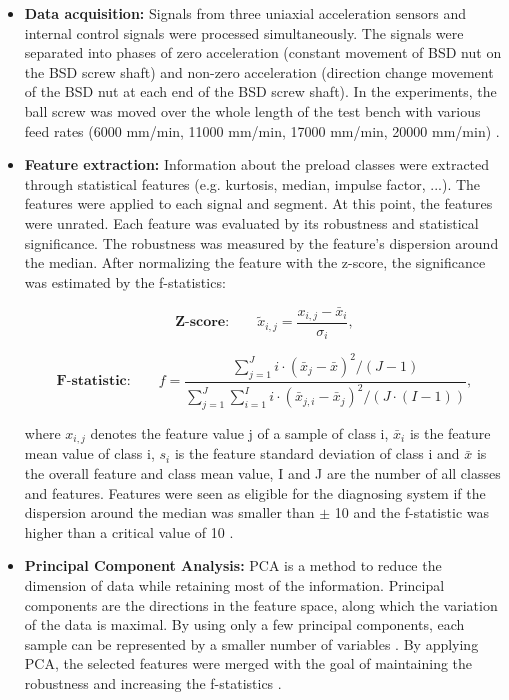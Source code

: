 \begin{itemize}
    \item \textbf{Data acquisition:} Signals from three uniaxial acceleration sensors and internal control signals were processed simultaneously. The signals were separated into phases of zero acceleration (constant movement of BSD nut on the BSD screw shaft) and non-zero acceleration (direction change movement of the BSD nut at each end of the BSD screw shaft). In the experiments, the ball screw was moved over the whole length of the test bench with various feed rates (6000 mm/min, 11000 mm/min, 17000 mm/min, 20000 mm/min) \cite{Denkena2021}.
    \item \textbf{Feature extraction:} Information about the preload classes were extracted through statistical features (e.g. kurtosis, median, impulse factor, ...). The features were applied to each signal and segment. At this point, the features were unrated. Each feature was evaluated by its robustness and statistical significance. The robustness was measured by the feature's dispersion around the median. After normalizing the feature with the z-score, the significance was estimated by the f-statistics:

    \begin{equation}
        \textbf{Z-score:}\qquad \tilde{x}_{i,j} = \frac{x_{i,j} - \bar x_{i}}{\sigma_{i}},
    \end{equation}
    
    \begin{equation}
        \textbf{F-statistic:}\qquad f = \frac{\sum_{j=1}^{J} i \cdot (\bar x_{j} -\bar x)^{2}/(J-1)}{\sum_{j=1}^{J} \sum_{i=1}^{I} i \cdot (\bar x_{j,i} -\bar x_{j})^{2}/(J \cdot (I-1))},
    \end{equation}

    
    where ${x}_{i,j}$ denotes the feature value j of a sample of class i, $\bar{x}_{i}$ is the feature mean value of class i, ${s}_{i}$ is the feature standard deviation of class i and $\bar{x}$ is the overall feature and class mean value, I and J are the number of all classes and features. Features were seen as eligible for the diagnosing system if the dispersion around the median was smaller than $\pm$ 10 and the f-statistic was higher than a critical value of 10 \cite{Denkena2021}. 
    
    \item \textbf{Principal Component Analysis:} 
    PCA is a method to reduce the dimension of data while retaining most of the information. Principal components are the directions in the feature space, along which the variation of the data is maximal. By using only a few principal components, each sample can be represented by a smaller number of variables \cite{Ringner2008}. By applying PCA, the selected features were merged with the goal of maintaining the robustness and increasing the f-statistics \cite{Denkena2021}.
    

\end{itemize}
